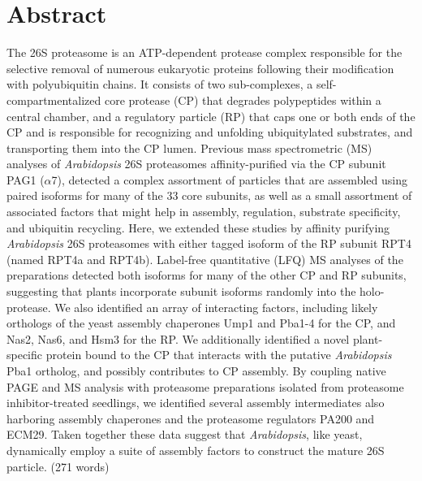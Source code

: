 \section{Abstract}
	The 26S proteasome is an ATP-dependent protease complex responsible for the selective removal of numerous eukaryotic proteins following their modification with polyubiquitin chains.  It consists of two sub-complexes, a self-compartmentalized core protease (CP) that degrades polypeptides within a central chamber, and a regulatory particle (RP) that caps one or both ends of the CP and is responsible for recognizing and unfolding ubiquitylated substrates, and transporting them into the CP lumen.  Previous mass spectrometric (MS) analyses of \textit{Arabidopsis} 26S proteasomes affinity-purified via the CP subunit PAG1 ($\alpha$7), detected a complex assortment of particles that are assembled using paired isoforms for many of the 33 core subunits, as well as a small assortment of associated factors that might help in assembly, regulation, substrate specificity, and ubiquitin recycling.  Here, we extended these studies by affinity purifying \textit{Arabidopsis} 26S proteasomes with either tagged isoform of the RP subunit RPT4 (named RPT4a and RPT4b).  Label-free quantitative (LFQ) MS analyses of the preparations detected both isoforms for many of the other CP and RP subunits, suggesting that plants incorporate subunit isoforms randomly into the holo-protease.  We also identified an array of interacting factors, including likely orthologs of the yeast assembly chaperones Ump1 and Pba1-4 for the CP, and Nas2, Nas6, and Hsm3 for the RP.  We additionally identified a novel plant-specific protein bound to the CP that interacts with the putative \textit{Arabidopsis} Pba1 ortholog, and possibly contributes to CP assembly.  By coupling native PAGE and MS analysis with proteasome preparations isolated from proteasome inhibitor-treated seedlings, we identified several assembly intermediates also harboring assembly chaperones and the proteasome regulators PA200 and ECM29.  Taken together these data suggest that \textit{Arabidopsis}, like yeast, dynamically employ a suite of assembly factors to construct the mature 26S particle.  (271 words)
 
